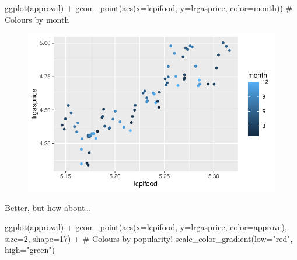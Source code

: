 \documentclass[
  letterpaper,
]{book}
\newenvironment{Shaded}{\begin{snugshade}}{\end{snugshade}}
\newcommand{\AttributeTok}[1]{\textcolor[rgb]{0.40,0.45,0.13}{#1}}
\newcommand{\CommentTok}[1]{\textcolor[rgb]{0.37,0.37,0.37}{#1}}
\newcommand{\DecValTok}[1]{\textcolor[rgb]{0.68,0.00,0.00}{#1}}
\newcommand{\FunctionTok}[1]{\textcolor[rgb]{0.28,0.35,0.67}{#1}}
\newcommand{\NormalTok}[1]{\textcolor[rgb]{0.00,0.23,0.31}{#1}}
\newcommand{\SpecialCharTok}[1]{\textcolor[rgb]{0.37,0.37,0.37}{#1}}
\newcommand{\StringTok}[1]{\textcolor[rgb]{0.13,0.47,0.30}{#1}}
\begin{document}
\begin{Shaded}
\begin{Highlighting}[]
\FunctionTok{ggplot}\NormalTok{(approval) }\SpecialCharTok{+}
  \FunctionTok{geom\_point}\NormalTok{(}\FunctionTok{aes}\NormalTok{(}\AttributeTok{x=}\NormalTok{lcpifood, }\AttributeTok{y=}\NormalTok{lrgasprice, }\AttributeTok{color=}\NormalTok{month))  }\CommentTok{\# Colours by month}
\end{Highlighting}
\end{Shaded}

\begin{figure}[H]

{\centering \includegraphics{Appendix1_files/figure-pdf/p2-1.pdf}

}

\end{figure}

Better, but how about\ldots{}

\begin{Shaded}
\begin{Highlighting}[]
\FunctionTok{ggplot}\NormalTok{(approval) }\SpecialCharTok{+}
  \FunctionTok{geom\_point}\NormalTok{(}\FunctionTok{aes}\NormalTok{(}\AttributeTok{x=}\NormalTok{lcpifood, }\AttributeTok{y=}\NormalTok{lrgasprice, }\AttributeTok{color=}\NormalTok{approve), }\AttributeTok{size=}\DecValTok{2}\NormalTok{, }\AttributeTok{shape=}\DecValTok{17}\NormalTok{) }\SpecialCharTok{+} \CommentTok{\# Colours by popularity!}
  \FunctionTok{scale\_color\_gradient}\NormalTok{(}\AttributeTok{low=}\StringTok{"red"}\NormalTok{, }\AttributeTok{high=}\StringTok{"green"}\NormalTok{) }
\end{Highlighting}
\end{Shaded}
\end{document}
